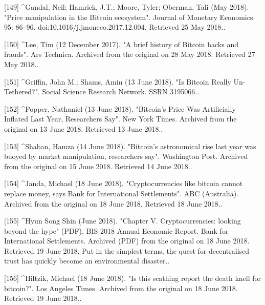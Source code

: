 [149]
^Gandal, Neil; Hamrick, J.T.; Moore, Tyler; Oberman, Tali (May 2018). "Price manipulation in the Bitcoin ecosystem". Journal of Monetary Economics. 95: 86–96. doi:10.1016/j.jmoneco.2017.12.004. Retrieved 25 May 2018..

[150]
^Lee, Tim (12 December 2017). "A brief history of Bitcoin hacks and frauds". Ars Technica. Archived from the original on 28 May 2018. Retrieved 27 May 2018..

[151]
^Griffin, John M.; Shams, Amin (13 June 2018). "Is Bitcoin Really Un-Tethered?". Social Science Research Network. SSRN 3195066..

[152]
^Popper, Nathaniel (13 June 2018). "Bitcoin's Price Was Artificially Inflated Last Year, Researchers Say". New York Times. Archived from the original on 13 June 2018. Retrieved 13 June 2018..

[153]
^Shaban, Hamza (14 June 2018). "Bitcoin's astronomical rise last year was buoyed by market manipulation, researchers say". Washington Post. Archived from the original on 15 June 2018. Retrieved 14 June 2018..

[154]
^Janda, Michael (18 June 2018). "Cryptocurrencies like bitcoin cannot replace money, says Bank for International Settlements". ABC (Australia). Archived from the original on 18 June 2018. Retrieved 18 June 2018..

[155]
^Hyun Song Shin (June 2018). "Chapter V. Cryptocurrencies: looking beyond the hype" (PDF). BIS 2018 Annual Economic Report. Bank for International Settlements. Archived (PDF) from the original on 18 June 2018. Retrieved 19 June 2018. Put in the simplest terms, the quest for decentralised trust has quickly become an environmental disaster..

[156]
^Hiltzik, Michael (18 June 2018). "Is this scathing report the death knell for bitcoin?". Los Angeles Times. Archived from the original on 18 June 2018. Retrieved 19 June 2018..


